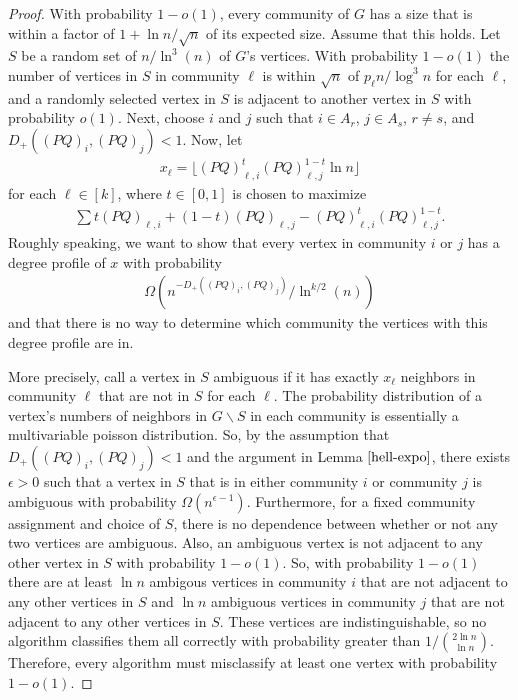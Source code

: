 \documentclass[11pt]{article}
\newcommand{\dd}{D_+}
\newcommand{\1}{\mathbb{1}}
\begin{document}
\begin{proof}
With probability $1-o(1)$, every community of $G$ has a size that is within a factor of $1+\ln n/\sqrt{n}$ of its expected size. Assume that this holds. Let $S$ be a random set of $n/\ln^3(n)$ of $G$'s vertices. With probability $1-o(1)$ the number of vertices in $S$ in community $\ell$ is within $\sqrt{n}$ of $p_\ell n/\log^3 n$ for each $\ell$, and a randomly selected vertex in $S$ is adjacent to another vertex in $S$ with probability $o(1)$. Next, choose $i$ and $j$ such that $i\in A_r$, $j\in A_s$, $r\ne s$, and $\dd ((PQ)_i , (PQ)_j) < 1$. Now, let 
\begin{align}
x_\ell=\lfloor (PQ)_{\ell,i}^t (PQ)_{\ell,j}^{1-t}\ln n\rfloor
\end{align}
for each $\ell \in [k]$, where $t\in [0,1]$ is chosen to maximize 
\begin{align}
\sum t(PQ)_{\ell,i}+(1-t)(PQ)_{\ell,j}-(PQ)_{\ell,i}^t(PQ)_{\ell,j}^{1-t}.
\end{align}
Roughly speaking, we want to show that every vertex in community $i$ or $j$ has a degree profile of $x$ with probability 
\begin{align}
\Omega(n^{-\dd ((PQ)_i , (PQ)_j)}/\ln^{k/2}(n))
\end{align}
and that there is no way to determine which community the vertices with this degree profile are in.

More precisely, call a vertex in $S$ ambiguous if it has exactly $x_\ell$ neighbors in community $\ell$ that are not in $S$ for each $\ell$. The probability distribution of a vertex's numbers of neighbors in $G\backslash S$ in each community is essentially a multivariable poisson distribution. So, by the assumption that $\dd ((PQ)_i , (PQ)_j) < 1$ and the argument in Lemma $\ref{hell-expo}$, there exists $\epsilon>0$ such that a vertex in $S$ that is in either community $i$ or community $j$ is ambiguous with probability $\Omega(n^{\epsilon-1})$. Furthermore, for a fixed community assignment and choice of $S$, there is no dependence between whether or not any two vertices are ambiguous. Also, an ambiguous vertex is not adjacent to any other vertex in $S$ with probability $1-o(1)$. So, with probability $1-o(1)$ there are at least $\ln n$ ambigous vertices in community $i$ that are not adjacent to any other vertices in $S$ and $\ln n$ ambiguous vertices in community $j$ that are not adjacent to any other vertices in $S$. These vertices are indistinguishable, so no algorithm classifies them all correctly with probability greater than $1/{2\ln n\choose \ln n}$. Therefore, every algorithm must misclassify at least one vertex with probability $1-o(1)$. 
\end{proof}
\end{document}
